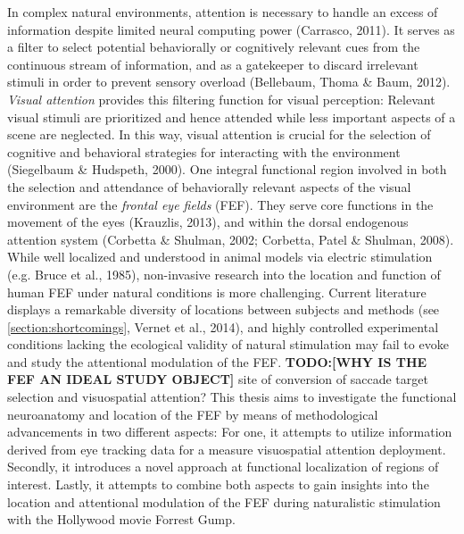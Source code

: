 \documentclass[a4paper, 12pt]{scrreprt}
\begin{document}
In complex natural environments, attention is necessary to handle an excess of information despite limited neural computing power (Carrasco, 2011). It serves as a filter to select potential behaviorally or cognitively relevant cues from the continuous stream of information, and as a gatekeeper to discard irrelevant stimuli in order to prevent sensory overload (Bellebaum, Thoma \& Baum, 2012). \textit{Visual attention} provides this filtering function for visual perception: Relevant visual stimuli are prioritized and hence attended while less important aspects of a scene are neglected. In this way, visual attention is crucial for the selection of cognitive and behavioral strategies for interacting with the environment (Siegelbaum \& Hudspeth, 2000).\newline
One integral functional region involved in both the selection and attendance of behaviorally relevant aspects of the visual environment are the \textit{frontal eye fields} (FEF). They serve core functions in the movement of the eyes (Krauzlis, 2013), and within the dorsal endogenous attention system (Corbetta \& Shulman, 2002; Corbetta, Patel \& Shulman, 2008). While well localized and understood in animal models via electric stimulation (e.g. Bruce et al., 1985), non-invasive research into the location and function of human FEF under natural conditions is more challenging. Current literature displays a remarkable diversity of locations between subjects and methods (see \ref{section:shortcomings}, Vernet et al., 2014), and highly controlled experimental conditions lacking the ecological validity of natural stimulation may fail to evoke and study the attentional modulation of the FEF. \newline
\textbf{TODO:[WHY IS THE FEF AN IDEAL STUDY OBJECT]} site of conversion of saccade target selection and visuospatial attention? \newline
This thesis aims to investigate the functional neuroanatomy and location of the FEF by means of methodological advancements in two different aspects: For one, it attempts to utilize information derived from eye tracking data for a measure visuospatial attention deployment. Secondly, it introduces a novel approach at functional localization of regions of interest. Lastly, it attempts to combine both aspects to gain insights into the location and attentional modulation of the FEF during naturalistic stimulation with the Hollywood movie Forrest Gump. \newline
\end{document}
